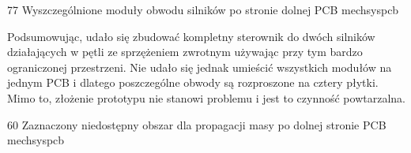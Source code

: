 	{77}
	{Wyszczególnione moduły obwodu silników po stronie dolnej PCB}
	{mechsyspcb}

Podsumowując, udało się zbudować kompletny sterownik do dwóch silników działających w pętli ze sprzężeniem zwrotnym używając przy tym bardzo ograniczonej przestrzeni. Nie udało się jednak umieścić wszystkich modułów na jednym PCB i dlatego poszczególne obwody są rozproszone na cztery płytki. Mimo to, złożenie prototypu nie stanowi problemu i jest to czynność powtarzalna.

	{60}
	{Zaznaczony niedostępny obszar dla propagacji masy po dolnej stronie PCB}
	{mechsyspcb}


\clearpage














